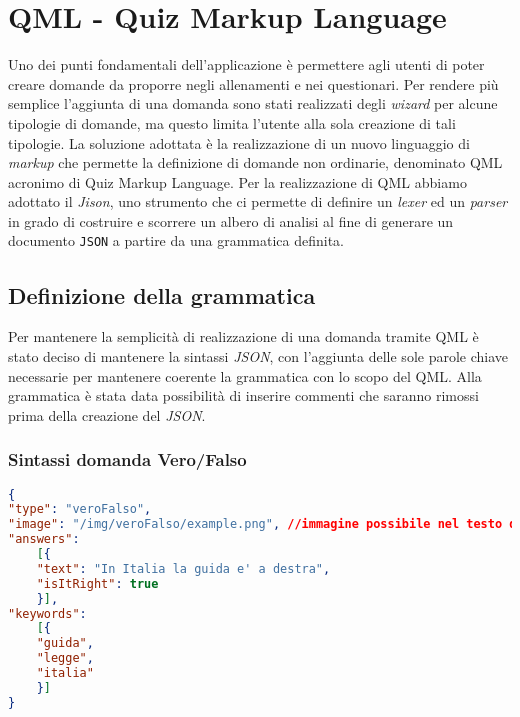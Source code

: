 \newpage
\section{QML - Quiz Markup Language}
Uno dei punti fondamentali dell'applicazione è permettere agli utenti di poter creare domande da proporre negli allenamenti e nei questionari. Per rendere più semplice l'aggiunta di una domanda sono stati realizzati degli \textit{wizard} per alcune tipologie di domande, ma questo limita l'utente alla sola creazione di tali tipologie. La soluzione adottata è la realizzazione di un nuovo linguaggio di \textit{markup} che permette la definizione di domande non ordinarie, denominato QML acronimo di Quiz Markup Language.
Per la realizzazione di QML abbiamo adottato il \textit{Jison}, uno strumento che ci permette di definire un \textit{lexer} ed un \textit{parser} in grado di costruire e scorrere un albero di analisi al fine di generare un documento \texttt{JSON} a partire da una grammatica definita.

\subsection{Definizione della grammatica}
Per mantenere la semplicità di realizzazione di una domanda tramite QML è stato deciso di mantenere la sintassi \textit{JSON}, con l'aggiunta delle sole parole chiave necessarie per mantenere coerente la grammatica con lo scopo del QML. Alla grammatica è stata data possibilità di inserire commenti che saranno rimossi prima della creazione del \textit{JSON}.

\subsubsection{Sintassi domanda Vero/Falso}
\begin{lstlisting}[language=json,firstnumber=1]
{	
"type": "veroFalso",
"image": "/img/veroFalso/example.png", //immagine possibile nel testo della domanda vero e falso
"answers":
	[{
	"text": "In Italia la guida e' a destra",
	"isItRight": true
	}],
"keywords":
	[{
	"guida",
	"legge",
	"italia"
	}] 
}
\end{lstlisting}

